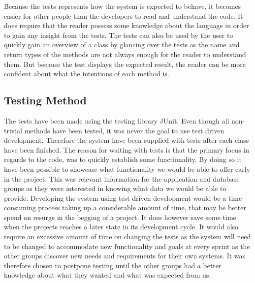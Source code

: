 Because the tests represents how the system is expected to behave, it becomes easier for other people than the developers to read and understand the code.
It does require that the reader possess some knowledge about the language in order to gain any insight from the tests.
The tests can also be used by the user to quickly gain an overview of a class by glancing over the tests as the name and return types of the methods are not always enough for the reader to understand them.
But because the test displays the expected result, the reader can be more confident about what the intentions of each method is.

\subsection{Testing Method}
The tests have been made using the testing library JUnit\cite{junit4}.
Even though all non-trivial methods have been tested, it was never the goal to use test driven development.
Therefore the system have been supplied with tests after each class have been finished. 
The reason for waiting with tests is that the primary focus in regards to the code, was to quickly establish some functionality. 
By doing so it have been possible to showcase what functionality we would be able to offer early in the project.%
This was relevant information for the application and database groups as they were interested in knowing what data we would be able to provide.
Developing the system using test driven development would be a time consuming process taking up a considerable amount of time, that may be better spend on resurge in the begging of a project.
It does however save some time when the projects reaches a later state in its development cycle.
It would also require an excessive amount of time on changing the tests as the system will need to be changed to accommodate new functionality and goals at every sprint as the other groups discover new needs and requirements for their own systems.
It was therefore chosen to postpone testing until the other groups had a better knowledge about what they wanted and what was expected from us.